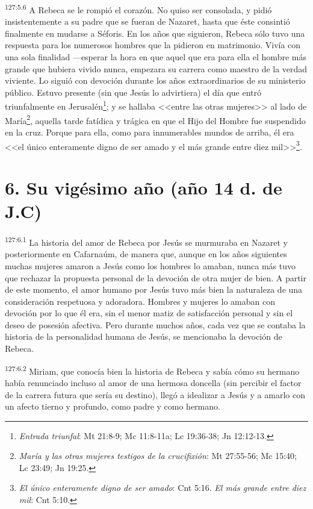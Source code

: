 \par 
\textsuperscript{127:5.6} A Rebeca se le rompió el corazón. No quiso ser consolada, y pidió insistentemente a su padre que se fueran de Nazaret, hasta que éste consintió finalmente en mudarse a Séforis. En los años que siguieron, Rebeca sólo tuvo una respuesta para los numerosos hombres que la pidieron en matrimonio. Vivía con una sola finalidad ---esperar la hora en que aquel que era para ella el hombre más grande que hubiera vivido nunca, empezara su carrera como maestro de la verdad viviente. Lo siguió con devoción durante los años extraordinarios de su ministerio público. Estuvo presente (sin que Jesús lo advirtiera) el día que entró triunfalmente en Jerusalén\footnote{\textit{Entrada triunfal}: Mt 21:8-9; Mc 11:8-11a; Lc 19:36-38; Jn 12:12-13.}; y se hallaba <<entre las otras mujeres>> al lado de María\footnote{\textit{María y las otras mujeres testigos de la crucifixión}: Mt 27:55-56; Mc 15:40; Lc 23:49; Jn 19:25.}, aquella tarde fatídica y trágica en que el Hijo del Hombre fue suspendido en la cruz. Porque para ella, como para innumerables mundos de arriba, él era <<el único enteramente digno de ser amado y el más grande entre diez mil>>\footnote{\textit{El único enteramente digno de ser amado}: Cnt 5:16. \textit{El más grande entre diez mil}: Cnt 5:10.}.

\section*{6. Su vigésimo año (año 14 d. de J.C)}
\par 
\textsuperscript{127:6.1} La historia del amor de Rebeca por Jesús se murmuraba en Nazaret y posteriormente en Cafarnaúm, de manera que, aunque en los años siguientes muchas mujeres amaron a Jesús como los hombres lo amaban, nunca más tuvo que rechazar la propuesta personal de la devoción de otra mujer de bien. A partir de este momento, el amor humano por Jesús tuvo más bien la naturaleza de una consideración respetuosa y adoradora. Hombres y mujeres lo amaban con devoción por lo que él era, sin el menor matiz de satisfacción personal y sin el deseo de posesión afectiva. Pero durante muchos años, cada vez que se contaba la historia de la personalidad humana de Jesús, se mencionaba la devoción de Rebeca.

\par 
\textsuperscript{127:6.2} Miriam, que conocía bien la historia de Rebeca y sabía cómo su hermano había renunciado incluso al amor de una hermosa doncella (sin percibir el factor de la carrera futura que sería su destino), llegó a idealizar a Jesús y a amarlo con un afecto tierno y profundo, como padre y como hermano.

